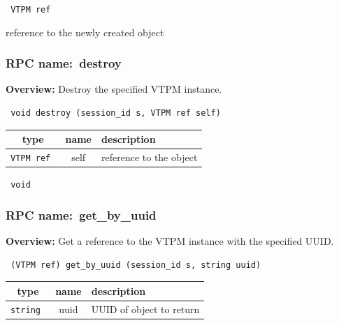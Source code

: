 \vspace{0.3cm}

{\tt 
VTPM ref
}


reference to the newly created object
\vspace{0.3cm}
\vspace{0.3cm}
\vspace{0.3cm}
\subsubsection{RPC name:~destroy}

{\bf Overview:} 
Destroy the specified VTPM instance.

\begin{verbatim} void destroy (session_id s, VTPM ref self)\end{verbatim}



 
\vspace{0.3cm}
\begin{tabular}{|c|c|p{7cm}|}
 \hline
{\bf type} & {\bf name} & {\bf description} \\ \hline
{\tt VTPM ref } & self & reference to the object \\ \hline 

\end{tabular}

\vspace{0.3cm}

{\tt 
void
}



\vspace{0.3cm}
\vspace{0.3cm}
\vspace{0.3cm}
\subsubsection{RPC name:~get\_by\_uuid}

{\bf Overview:} 
Get a reference to the VTPM instance with the specified UUID.

\begin{verbatim} (VTPM ref) get_by_uuid (session_id s, string uuid)\end{verbatim}



 
\vspace{0.3cm}
\begin{tabular}{|c|c|p{7cm}|}
 \hline
{\bf type} & {\bf name} & {\bf description} \\ \hline
{\tt string } & uuid & UUID of object to return \\ \hline 

\end{tabular}

